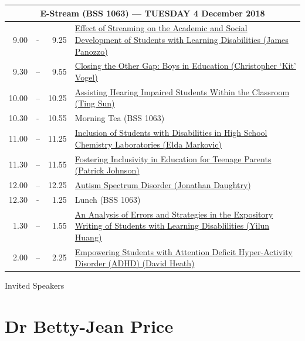 \documentclass[twoside,12pt,a4paper,notitlepage]{memoir}
\begin{document}
\begin{center}
\begin{tabular}{rcr|p{10.8cm}}
 \multicolumn{4}{c}{{\large E-Stream (BSS 1063) --- TUESDAY 4 December 2018}} \\ \hline
9.00 & - & 9.25 &
 \hyperref[aut:panozzo]{Effect of Streaming on the Academic and Social Development of Students with Learning Disabilities (James Panozzo)} \\ \hline
9.30 & – & 9.55 &
\hyperref[aut:vogel]{Closing the Other Gap: Boys in Education (Christopher `Kit' Vogel)} \\ \hline
10.00 & – & 10.25 &
\hyperref[aut:sun]{Assisting Hearing Impaired Students Within the Classroom (Ting Sun)} \\ \hline
10.30 & - & 10.55 & Morning Tea (BSS 1063) \\ \hline
11.00 & – & 11.25 & 
 \hyperref[aut:markovic]{Inclusion of Students with Disabilities in High School Chemistry Laboratories (Elda Markovic)} \\ \hline
11.30 & – & 11.55 &
 \hyperref[aut:johnson]{Fostering Inclusivity in Education for Teenage Parents (Patrick Johnson)} \\ \hline
12.00 & – & 12.25 &
 \hyperref[aut:daughtry]{Autism Spectrum Disorder (Jonathan Daughtry)} \\ \hline
12.30 & - & 1.25 & Lunch (BSS 1063) \\ \hline
1.30 & – & 1.55 &
 \hyperref[aut:huang]{An Analysis of Errors and Strategies in the Expository Writing of Students with Learning Disablilities (Yilun Huang)} \\ \hline
2.00 & – & 2.25 & 
 \hyperref[aut:heath]{Empowering Students with Attention Deficit Hyper-Activity Disorder (ADHD) (David Heath)} \\ \hline
\end{tabular}
\end{center}


% 


\clearpage{}



\clearpage{}
\vspace*{2cm}
{\Huge Invited Speakers}
\vspace{2cm}

\section*{Dr Betty-Jean Price}
\end{document}
